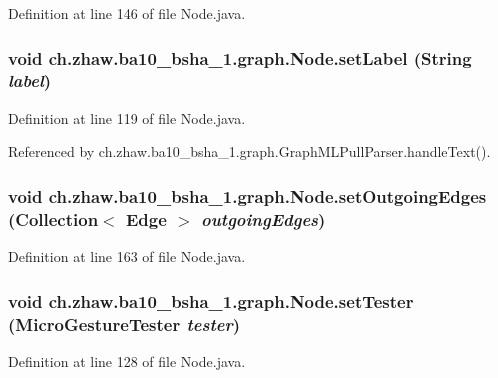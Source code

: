 Definition at line 146 of file Node.java.\hypertarget{classch_1_1zhaw_1_1ba10__bsha__1_1_1graph_1_1Node_a1a6b348d6dba34a3f7b6ec9f742952f6}{
\subsubsection[{setLabel}]{\setlength{\rightskip}{0pt plus 5cm}void ch.zhaw.ba10\_\-bsha\_\-1.graph.Node.setLabel (String {\em label})}}
\label{classch_1_1zhaw_1_1ba10__bsha__1_1_1graph_1_1Node_a1a6b348d6dba34a3f7b6ec9f742952f6}


Definition at line 119 of file Node.java.

Referenced by ch.zhaw.ba10\_\-bsha\_\-1.graph.GraphMLPullParser.handleText().\hypertarget{classch_1_1zhaw_1_1ba10__bsha__1_1_1graph_1_1Node_add712262f47c24d3af3b3fa4150566e1}{
\subsubsection[{setOutgoingEdges}]{\setlength{\rightskip}{0pt plus 5cm}void ch.zhaw.ba10\_\-bsha\_\-1.graph.Node.setOutgoingEdges (Collection$<$ {\bf Edge} $>$ {\em outgoingEdges})}}
\label{classch_1_1zhaw_1_1ba10__bsha__1_1_1graph_1_1Node_add712262f47c24d3af3b3fa4150566e1}


Definition at line 163 of file Node.java.\hypertarget{classch_1_1zhaw_1_1ba10__bsha__1_1_1graph_1_1Node_a6dcb93d4c25e370c84741db17e59d2af}{
\subsubsection[{setTester}]{\setlength{\rightskip}{0pt plus 5cm}void ch.zhaw.ba10\_\-bsha\_\-1.graph.Node.setTester ({\bf MicroGestureTester} {\em tester})}}
\label{classch_1_1zhaw_1_1ba10__bsha__1_1_1graph_1_1Node_a6dcb93d4c25e370c84741db17e59d2af}


Definition at line 128 of file Node.java.

